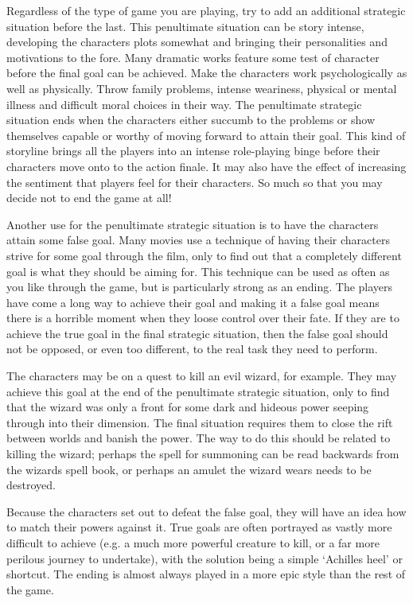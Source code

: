 \documentclass[twoside]{book}
\begin{document}
Regardless of the type of game you are playing, try to add an
additional strategic situation before the last. This penultimate
situation can be story intense, developing the characters plots
somewhat and bringing their personalities and motivations to the
fore. Many dramatic works feature some test of character before the
final goal can be achieved. Make the characters work psychologically
as well as physically. Throw family problems, intense weariness,
physical or mental illness and difficult moral choices in their
way. The penultimate strategic situation ends when the characters
either succumb to the problems or show themselves capable or worthy of
moving forward to attain their goal. This kind of storyline brings all
the players into an intense role-playing binge before their characters
move onto to the action finale. It may also have the effect of
increasing the sentiment that players feel for their characters. So
much so that you may decide not to end the game at all!

Another use for the penultimate strategic situation is to have the
characters attain some false goal. Many movies use a technique of
having their characters strive for some goal through the film, only to
find out that a completely different goal is what they should be
aiming for. This technique can be used as often as you like through
the game, but is particularly strong as an ending. The players have
come a long way to achieve their goal and making it a false goal means
there is a horrible moment when they loose control over their fate. If
they are to achieve the true goal in the final strategic situation,
then the false goal should not be opposed, or even too different, to
the real task they need to perform.

The characters may be on a quest to kill an evil wizard, for
example. They may achieve this goal at the end of the penultimate
strategic situation, only to find that the wizard was only a front for
some dark and hideous power seeping through into their dimension. The
final situation requires them to close the rift between worlds and
banish the power. The way to do this should be related to killing the
wizard; perhaps the spell for summoning can be read backwards from the
wizards spell book, or perhaps an amulet the wizard wears needs to be
destroyed.

Because the characters set out to defeat the false goal, they will
have an idea how to match their powers against it. True goals are
often portrayed as vastly more difficult to achieve (e.g. a much more
powerful creature to kill, or a far more perilous journey to
undertake), with the solution being a simple `Achilles heel' or
shortcut. The ending is almost always played in a more epic style than
the rest of the game.
\end{document}

